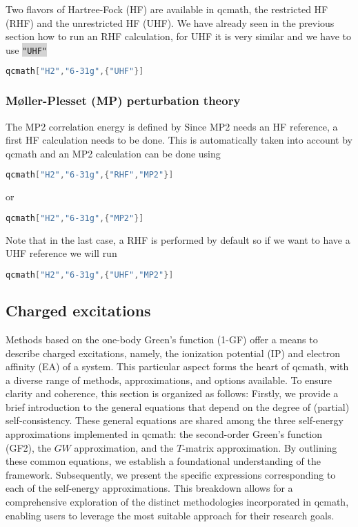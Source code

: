 \documentclass[aip,jcp,reprint,noshowkeys,superscriptaddress]{revtex4-1}
\newcommand{\EcMP}{E_c^{\text{MP2}}}
\newcommand{\eHF}[1]{\epsilon^\text{HF}_{#1}}
\newcommand{\keyword}[1]{{\colorbox{lightgray}{\texttt{#1}}}}
\begin{document}
Two flavors of Hartree-Fock (HF) are available in qcmath, the restricted HF (RHF) and the unrestricted HF (UHF). We have already seen in the previous section how to run an RHF calculation, for UHF it is very similar and we have to use \keyword{"UHF"}
\begin{lstlisting}[extendedchars=true,language=Mathematica]
qcmath["H2","6-31g",{"UHF"}]
\end{lstlisting}

\subsubsection*{M\o{}ller-Plesset (MP) perturbation theory}
The MP2 correlation energy is defined by 
Since MP2 needs an HF reference, a first HF calculation needs to be done. This is automatically taken into account by qcmath and an MP2 calculation can be done using 
\begin{lstlisting}[extendedchars=true,language=Mathematica]
qcmath["H2","6-31g",{"RHF","MP2"}]
\end{lstlisting}
or 
\begin{lstlisting}[extendedchars=true,language=Mathematica]
qcmath["H2","6-31g",{"MP2"}]
\end{lstlisting}
Note that in the last case, a RHF is performed by default so if we want to have a UHF reference we will run
\begin{lstlisting}[extendedchars=true,language=Mathematica]
qcmath["H2","6-31g",{"UHF","MP2"}]
\end{lstlisting}

\subsection{Charged excitations}
\label{sec:charged_excitations}
Methods based on the one-body Green's function (1-GF) offer a means to describe charged excitations, namely, the ionization potential (IP) and electron affinity (EA) of a system. This particular aspect forms the heart of qcmath, with a diverse range of methods, approximations, and options available. To ensure clarity and coherence, this section is organized as follows:
Firstly, we provide a brief introduction to the general equations that depend on the degree of (partial) self-consistency. These general equations are shared among the three self-energy approximations implemented in qcmath: the second-order Green's function (GF2), the $GW$ approximation, and the $T$-matrix approximation. By outlining these common equations, we establish a foundational understanding of the framework.
Subsequently, we present the specific expressions corresponding to each of the self-energy approximations. This breakdown allows for a comprehensive exploration of the distinct methodologies incorporated in qcmath, enabling users to leverage the most suitable approach for their research goals.
\end{document}

